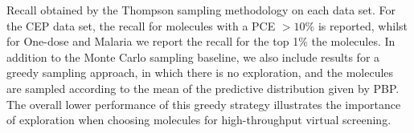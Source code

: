 Recall obtained by the Thompson sampling methodology on each data set. For the CEP data set, the recall for molecules with a PCE $>10\%$ is reported, whilst for One-dose and Malaria we report the recall for the top 1\% the molecules. In addition to the Monte Carlo sampling baseline, we also include results for a greedy sampling approach, in which there is no exploration, and the molecules are sampled according to the mean of the predictive distribution given by PBP. The overall lower performance of this greedy strategy illustrates the importance of exploration when choosing molecules for high-throughput virtual screening.\label{fig:thompson_1pc}
